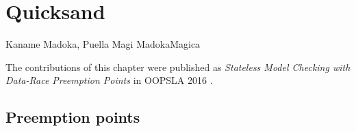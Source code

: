 \chapter{Quicksand}
\label{chap:quicksand}
{Kaname Madoka, Puella Magi Madoka{\raisebox{0.1em}{$\scriptstyle \bigstar$}}Magica}



The contributions of this chapter were published as
{\em Stateless Model Checking with Data-Race Preemption Points}
in OOPSLA 2016 \cite{quicksand}.


\section{Preemption points}
\label{sec:quicksand-pps}



